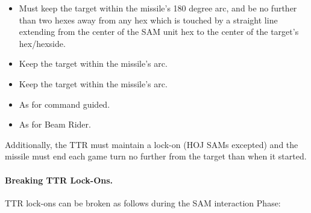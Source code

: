 \begin{itemize}
    \item{} Must keep the target within the missile's 180 degree arc, and be no further than two hexes away from any hex which is touched by a straight line extending from the center of the SAM unit hex to the center of the target's hex/hexside.

    \item{} Keep the target within the missile's  arc.

    \item{} Keep the target within the missile's  arc.

    \item{} As for command guided.

    \item{} As for Beam Rider.
\end{itemize}

Additionally, the TTR must maintain a lock-on (HOJ SAMs excepted) and the missile must end each game turn no further from the target than when it started.

\paragraph{Breaking TTR Lock-Ons.} 

TTR lock-ons can be broken as follows during the SAM interaction Phase:

